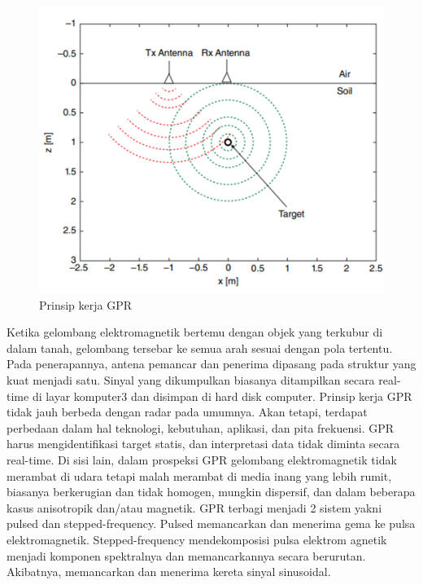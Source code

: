 \begin{figure} [H] \centering
  \includegraphics[scale=0.7]{gambar/bab2/gpr1.png}
  \caption{Prinsip kerja GPR \parencite{Persico2014}}
  \label{fig:GPRKerja}
\end{figure}

Ketika gelombang elektromagnetik bertemu dengan objek yang terkubur di dalam tanah, gelombang tersebar ke semua arah sesuai dengan pola tertentu. Pada penerapannya, antena pemancar dan penerima dipasang pada struktur yang kuat menjadi satu. Sinyal yang dikumpulkan biasanya ditampilkan secara real-time di layar komputer3 dan disimpan di hard disk computer. Prinsip kerja GPR tidak jauh berbeda dengan radar pada umumnya. Akan tetapi, terdapat perbedaan dalam hal teknologi, kebutuhan, aplikasi, dan pita frekuensi. GPR harus mengidentifikasi target statis, dan interpretasi data tidak diminta secara real-time. Di sisi lain, dalam prospeksi GPR gelombang elektromagnetik tidak merambat di udara tetapi malah merambat di media inang yang lebih rumit, biasanya berkerugian dan tidak homogen, mungkin dispersif, dan dalam beberapa kasus anisotropik dan/atau magnetik. GPR terbagi menjadi 2 sistem yakni pulsed dan stepped-frequency. Pulsed memancarkan dan menerima gema ke pulsa elektromagnetik. Stepped-frequency mendekomposisi pulsa elektrom agnetik menjadi komponen spektralnya dan memancarkannya secara berurutan. Akibatnya, memancarkan dan menerima kereta sinyal sinusoidal\parencite{Persico2014}.


